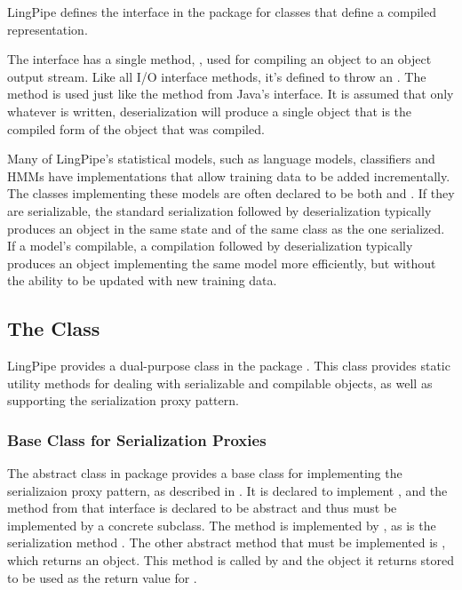 LingPipe defines the interface  in the package
 for classes that define a compiled
representation. 

The interface has a single method, ,
used for compiling an object to an object output stream.  Like all I/O
interface methods, it's defined to throw an .  The
method is used just like the  method
from Java's  interface.  It is assumed that only
whatever is written, deserialization will produce a single object that
is the compiled form of the object that was compiled.  

Many of LingPipe's statistical models, such as language models,
classifiers and HMMs have implementations that allow training data to
be added incrementally.  The classes implementing these models are
often declared to be both  and .
If they are serializable, the standard serialization followed by
deserialization typically produces an object in the same state and
of the same class as the one serialized.  If a model's compilable,
a compilation followed by deserialization typically produces an
object implementing the same model more efficiently, but without the
ability to be updated with new training data. 

\subsection{The  Class}\label{section:io-abstract-externalizable}

LingPipe provides a dual-purpose class 
in the package .  This class provides static
utility methods for dealing with serializable and compilable objects,
as well as supporting the serialization proxy pattern.

\subsubsection{Base Class for Serialization Proxies}

The abstract class  in package
 provides a base class for implementing the
serializaion proxy pattern, as described in
.  It is declared to implement
, and the 
method from that interface is declared to be abstract and thus must be
implemented by a concrete subclass.  The method
 is implemented by
, as is the serialization method
.  The other abstract method that must be
implemented is , which returns an object.
This method is called by  and the object it
returns stored to be used as the return value for
.

